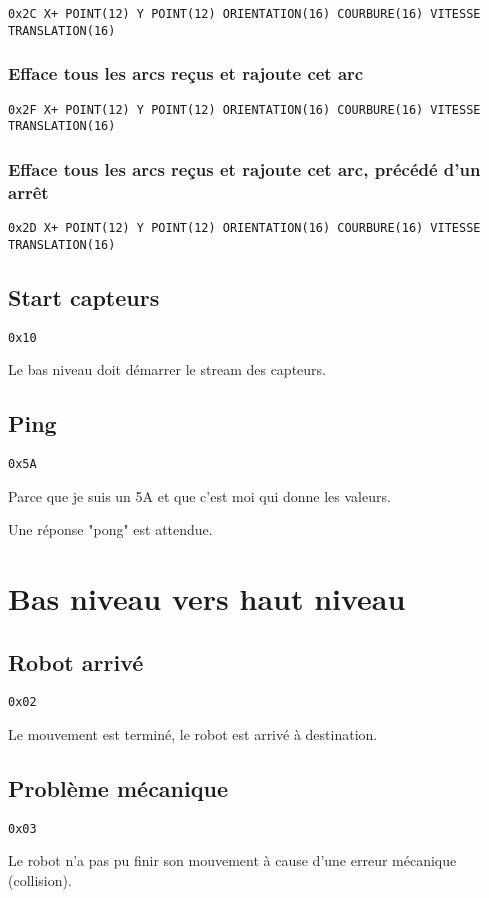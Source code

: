 \documentclass[a4paper, 12pt]{article}
\begin{document}
    \texttt{0x2C X+ POINT(12) Y POINT(12) ORIENTATION(16) COURBURE(16) VITESSE TRANSLATION(16)}

\subsubsection{Efface tous les arcs reçus et rajoute cet arc}

    \texttt{0x2F X+ POINT(12) Y POINT(12) ORIENTATION(16) COURBURE(16) VITESSE TRANSLATION(16)}
    
\subsubsection{Efface tous les arcs reçus et rajoute cet arc, précédé d'un arrêt} 

\texttt{0x2D X+ POINT(12) Y POINT(12) ORIENTATION(16) COURBURE(16) VITESSE TRANSLATION(16)}
    
\subsection{Start capteurs}
\texttt{0x10}
    
Le bas niveau doit démarrer le stream des capteurs.
    
\subsection{Ping}
    \texttt{0x5A}
    
    Parce que je suis un 5A et que c'est moi qui donne les valeurs.
    
    Une réponse "pong" est attendue.

\section{Bas niveau vers haut niveau}

\subsection{Robot arrivé}
    \texttt{0x02}
    
Le mouvement est terminé, le robot est arrivé à destination.
    
\subsection{Problème mécanique}
    \texttt{0x03}
    
Le robot n'a pas pu finir son mouvement à cause d'une erreur mécanique (collision).
\end{document}
